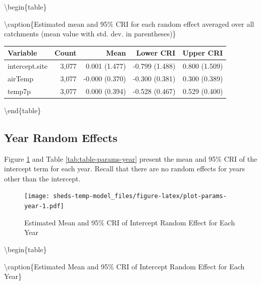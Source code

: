 \documentclass[]{book}
\begin{document}
\textbackslash{}begin\{table\}

\textbackslash{}caption\{\label{tab:table-params-catchment}Estimated mean and 95\% CRI for each random effect averaged over all catchments (mean value with std. dev. in parentheses)\}
\centering

\begin{tabular}[t]{l|r|r|r|r}
\hline
Variable & Count & Mean & Lower CRI & Upper CRI\\
\hline
intercept.site & 3,077 & 0.001 (1.477) & -0.799 (1.488) & 0.800 (1.509)\\
\hline
airTemp & 3,077 & -0.000 (0.370) & -0.300 (0.381) & 0.300 (0.389)\\
\hline
temp7p & 3,077 & 0.000 (0.394) & -0.528 (0.467) & 0.529 (0.400)\\
\hline
\end{tabular}

\textbackslash{}end\{table\}

\hypertarget{year-random-effects-1}{%
\subsection{Year Random Effects}\label{year-random-effects-1}}

Figure \ref{fig:plot-params-year} and Table \ref{tab:table-params-year} present the mean and 95\% CRI of the intercept term for each year. Recall that there are no random effects for years other than the intercept.

\begin{figure}
\centering
\texttt{[image: sheds-temp-model\_files/figure-latex/plot-params-year-1.pdf]}
\caption{\label{fig:plot-params-year}Estimated Mean and 95\% CRI of Intercept Random Effect for Each Year}
\end{figure}

\textbackslash{}begin\{table\}

\textbackslash{}caption\{\label{tab:table-params-year}Estimated Mean and 95\% CRI of Intercept Random Effect for Each Year\}
\centering
\end{document}
